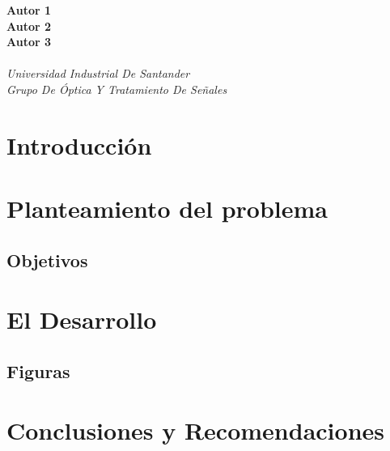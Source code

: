 \documentclass[spanish,notitlepage,letterpaper,11pt]{article} %
\numberwithin{equation}{subsection}
\begin{document}
\begin{titlepage}
\textwidth
\textbf{Autor 1 \\
Autor 2\\
Autor 3 \\} \\
\vspace{\baselineskip}
\vspace{\baselineskip}
\textit{Universidad Industrial De Santander}\\
\vspace{\baselineskip}
\textit{Grupo De Óptica Y Tratamiento De Señales}\\
\vspace{\baselineskip}
\date{31/01/2023}
\vspace{\baselineskip}


\vspace{2cm} 
\end{titlepage}

\newpage
\tableofcontents
\begin{abstract}
Y aquí el resumen. El resumen debe ser suficiente para que uno no se lea el documento. Toda la información importante y trascendente del documento debe estar aquí. Típicamente debe tener una extensión entre 400 a 500 palabras.  
\end{abstract}
\section{Introducción}


\section{Planteamiento del problema}

\subsection{Objetivos}


\section{El Desarrollo}


\subsection{Figuras}



\section{Conclusiones y Recomendaciones}


{}

\end{document}
